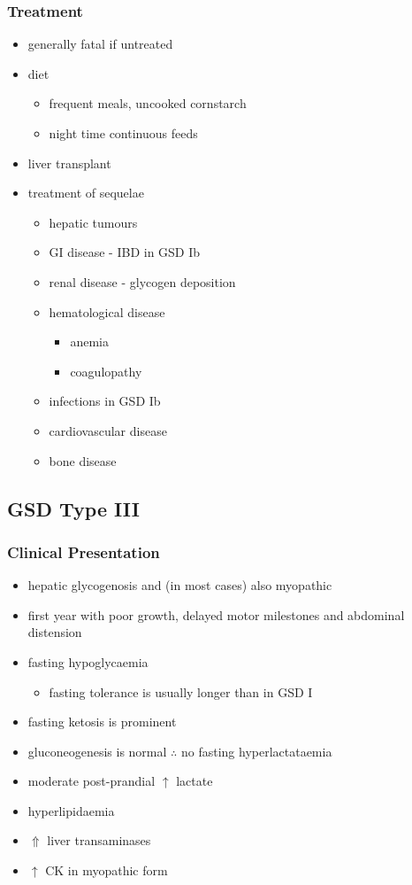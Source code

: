 \documentclass[12pt]{scrartcl}
\begin{document}
\subsubsection{Treatment}
\label{sec:orgb662c5a}
\begin{itemize}
\item generally fatal if untreated
\item diet
\begin{itemize}
\item frequent meals, uncooked cornstarch
\item night time continuous feeds
\end{itemize}
\item liver transplant
\item treatment of sequelae
\begin{itemize}
\item hepatic tumours
\item GI disease - IBD in GSD Ib
\item renal disease - glycogen deposition
\item hematological disease
\begin{itemize}
\item anemia
\item coagulopathy
\end{itemize}
\item infections in GSD Ib
\item cardiovascular disease
\item bone disease
\end{itemize}
\end{itemize}

\subsection{GSD Type III}
\label{sec:org581334c}
\subsubsection{Clinical Presentation}
\label{sec:org60004bd}
\begin{itemize}
\item hepatic glycogenosis and (in most cases) also myopathic
\item first year with poor growth, delayed motor milestones and abdominal
distension
\item fasting hypoglycaemia 
\begin{itemize}
\item fasting tolerance is usually longer than in GSD I
\end{itemize}
\item fasting ketosis is prominent
\item gluconeogenesis is normal \(\therefore\) no fasting hyperlactataemia
\item moderate post-prandial \(\uparrow\) lactate
\item hyperlipidaemia
\item \(\Uparrow\) liver transaminases
\item \(\uparrow\) CK in myopathic form
\end{itemize}
\end{document}
